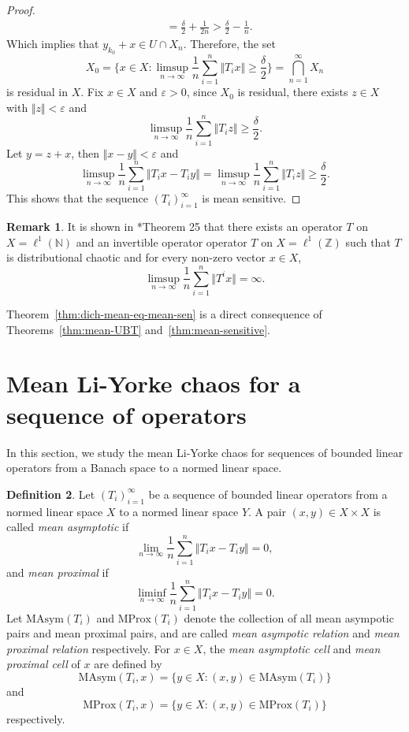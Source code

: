 \documentclass[12pt,a4paper]{amsart}
\theoremstyle{definition}
\newtheorem{defn}{Definition}[section]
\newtheorem{rem}[defn]{Remark}
\theoremstyle{plain}
\begin{document}
\begin{proof}
\begin{align*}
         & =\frac{\delta}{2} + \frac{1}{2n} > \frac{\delta}{2}-\frac{1}{n}.
    \end{align*}
    Which implies that $y_{k_0}+x\in U\cap X_n$.
    Therefore, the set
    \[
        X_0= \biggl\{x\in X: \limsup_{n\to \infty} \frac{1}{n}\sum_{i=1}^{n}\Vert T_ix \Vert \ge \frac{\delta}{2} \biggr\} =\bigcap_{n=1}^{\infty}X_n
    \]
    is residual in $X$.
    Fix $x\in X$ and $\varepsilon>0$,
    since $X_0$ is residual, there exists $z\in X$ with $\Vert z \Vert <\varepsilon$ and
    \[
        \limsup_{n\to \infty} \frac{1}{n}\sum_{i=1}^{n}\Vert T_iz \Vert \ge \frac{\delta}{2}.
    \]
    Let $y=z+x$, then $\Vert x-y \Vert <\varepsilon$ and
    \[
        \limsup_{n\to \infty} \frac{1}{n}\sum_{i=1}^{n}\Vert T_ix -T_iy\Vert =\limsup_{n\to \infty} \frac{1}{n}\sum_{i=1}^{n}\Vert T_iz \Vert \ge \frac{\delta}{2}.
    \]
    This shows that the sequence $(T_i)_{i=1}^{\infty}$ is mean sensitive.
\end{proof}

\begin{rem}
It is shown in \cite{BBPW2018}*{Theorem 25} that
there exists an operator $T$ on $X=\ell^1(\mathbb{N})$ and an invertible operator operator $T$ on $X=\ell^1(\mathbb{Z})$ such that $T$ is distributional chaotic and for every non-zero vector $x\in X$,
    \[
        \limsup_{n\to \infty} \frac{1}{n} \sum_{i=1}^{n} \Vert T^i x\Vert=\infty.
    \]
\end{rem}

Theorem~\ref{thm:dich-mean-eq-mean-sen} is a direct consequence of 
 Theorems~\ref{thm:mean-UBT} and~\ref{thm:mean-sensitive}.

\section{Mean Li-Yorke chaos for a  sequence of operators}\label{sec:MlY}

In this section, we study the mean Li-Yorke chaos for sequences of bounded linear operators from a Banach space to a normed linear space.

\begin{defn}
    Let $(T_i)_{i=1}^{\infty}$ be a sequence of bounded linear operators from a normed linear space $X$ to a normed linear space $Y$.
    A pair $(x,y)\in X\times X$ is called \emph{mean asymptotic} if
    \[
        \lim_{n\to \infty} \frac{1}{n} \sum_{i=1}^{n} \Vert T_ix-T_iy \Vert =0,
    \]
    and \emph{mean proximal} if
    \[
        \liminf_{n\to \infty} \frac{1}{n} \sum_{i=1}^{n} \Vert T_ix-T_iy \Vert =0.
    \]
    Let $\text{MAsym}(T_i)$ and $\text{MProx}(T_i)$ denote the collection of all mean asympotic pairs and mean proximal pairs, and are called \emph{mean asympotic relation} and \emph{mean proximal relation} respectively.
    For $x\in X$, the \emph{mean asymptotic cell} and \emph{mean proximal cell} of $x$ are defined by
    $$\text{MAsym}(T_i,x)=\{y\in X: (x,y)\in \text{MAsym}(T_i) \} $$
    and
    $$\text{MProx}(T_i,x)=\{y\in X: (x, y)\in \text{MProx}(T_i)\}$$
    respectively.
\end{defn}
\end{document}
